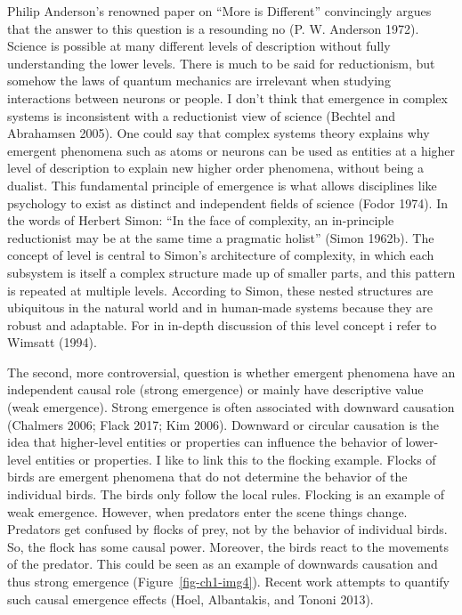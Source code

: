 \documentclass[
  a4paper,
  DIV=11,
  numbers=noendperiod,
  oneside]{scrreprt}
\begin{document}
Philip Anderson's renowned paper on ``More is Different'' convincingly
argues that the answer to this question is a resounding no (P. W.
Anderson 1972). Science is possible at many different levels of
description without fully understanding the lower levels. There is much
to be said for reductionism, but somehow the laws of quantum mechanics
are irrelevant when studying interactions between neurons or people. I
don't think that emergence in complex systems is inconsistent with a
reductionist view of science (Bechtel and Abrahamsen 2005). One could
say that complex systems theory explains why emergent phenomena such as
atoms or neurons can be used as entities at a higher level of
description to explain new higher order phenomena, without being a
dualist. This fundamental principle of emergence is what allows
disciplines like psychology to exist as distinct and independent fields
of science (Fodor 1974). In the words of Herbert Simon: ``In the face of
complexity, an in-principle reductionist may be at the same time a
pragmatic holist'' (Simon 1962b). The concept of level is central to
Simon's architecture of complexity, in which each subsystem is itself a
complex structure made up of smaller parts, and this pattern is repeated
at multiple levels. According to Simon, these nested structures are
ubiquitous in the natural world and in human-made systems because they
are robust and adaptable. For in in-depth discussion of this level
concept i refer to Wimsatt (1994).

The second, more controversial, question is whether emergent phenomena
have an independent causal role (strong emergence) or mainly have
descriptive value (weak emergence). Strong emergence is often associated
with downward causation (Chalmers 2006; Flack 2017; Kim 2006). Downward
or circular causation is the idea that higher-level entities or
properties can influence the behavior of lower-level entities or
properties. I like to link this to the flocking example. Flocks of birds
are emergent phenomena that do not determine the behavior of the
individual birds. The birds only follow the local rules. Flocking is an
example of weak emergence. However, when predators enter the scene
things change. Predators get confused by flocks of prey, not by the
behavior of individual birds. So, the flock has some causal power.
Moreover, the birds react to the movements of the predator. This could
be seen as an example of downwards causation and thus strong emergence
(Figure~\ref{fig-ch1-img4}). Recent work attempts to quantify such
causal emergence effects (Hoel, Albantakis, and Tononi 2013).
\end{document}
